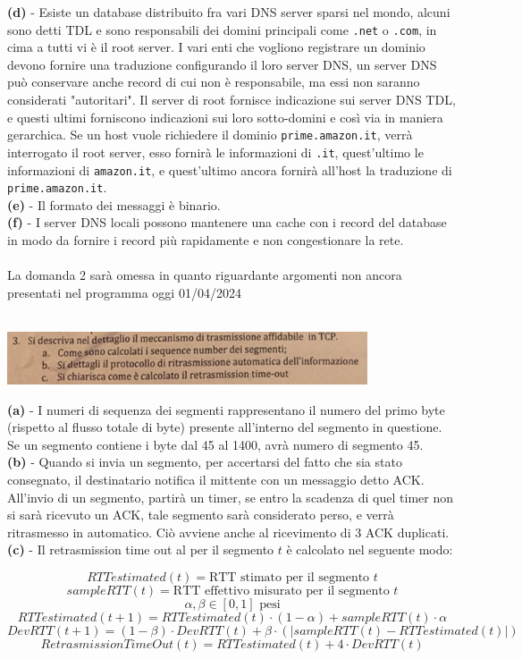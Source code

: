 \documentclass[12pt, letterpaper]{article}
\newcommand{\code}[1]{\colorbox{light-gray}{\texttt{#1}}}
\newcommand{\acc}{\\\hphantom{}\\}
\begin{document}
\textbf{(d)} - Esiste un database distribuito fra vari DNS server sparsi nel mondo, alcuni sono detti 
TDL e sono responsabili dei domini principali come \code{.net} o \code{.com}, in cima a tutti vi è il 
root server. I vari enti che vogliono registrare un dominio devono fornire una traduzione configurando il loro 
server DNS, un server DNS può conservare anche record di cui non è responsabile, ma essi non saranno considerati 
"autoritari". Il server di root fornisce indicazione sui server DNS TDL, e questi ultimi forniscono indicazioni sui loro 
sotto-domini e così via in maniera gerarchica. Se un host vuole richiedere il dominio \code{prime.amazon.it}, 
verrà interrogato il root server, esso fornirà le informazioni di \code{.it}, quest'ultimo le informazioni di 
\code{amazon.it}, e quest'ultimo ancora fornirà all'host la traduzione di \code{prime.amazon.it}.
\\\textbf{(e)} - Il formato dei messaggi è binario.\\ 
\textbf{(f)} - I server DNS locali possono mantenere una cache con i record del database in modo 
da fornire i record più rapidamente e non congestionare la rete.\acc 
\color{red}La domanda 2 sarà omessa in quanto riguardante argomenti non ancora presentati 
nel programma oggi 01/04/2024\color{black}\hphantom{text}\acc
\begin{center}
    \includegraphics[width=0.8\textwidth ]{aperte3.png}
\end{center}
\textbf{(a)} - I numeri di sequenza dei segmenti rappresentano il numero del primo byte (rispetto al flusso totale 
di byte) presente all'interno del segmento in questione. Se un segmento contiene i byte dal 45 al 1400, avrà numero di 
segmento 45.\\
\textbf{(b)} - Quando si invia un segmento, per accertarsi del fatto che sia stato consegnato, il destinatario notifica 
il mittente con un messaggio detto ACK. All'invio di un segmento, partirà un timer, se entro la scadenza di quel timer non 
si sarà ricevuto un ACK, tale segmento sarà considerato perso, e verrà ritrasmesso in automatico. Ciò avviene anche 
al ricevimento di 3 ACK duplicati.\\ 
\textbf{(c)} - Il retrasmission time out al per il segmento $t$ è calcolato nel seguente modo:

$$ RTTestimated(t) = \text{RTT stimato per il segmento }t $$
$$ sampleRTT(t) = \text{RTT effettivo misurato per il segmento }t$$
$$ \alpha,\beta \in [0,1] \text{ pesi}$$
$$  RTTestimated(t+1)=RTTestimated(t)\cdot(1-\alpha) + sampleRTT(t)\cdot \alpha$$ 
$$ DevRTT(t+1) = (1-\beta) \cdot DevRTT(t)+\beta\cdot (|sampleRTT(t)-RTTestimated(t)|)$$
    $$RetrasmissionTimeOut(t) = RTTestimated(t)+4\cdot DevRTT(t) $$
\end{document}
